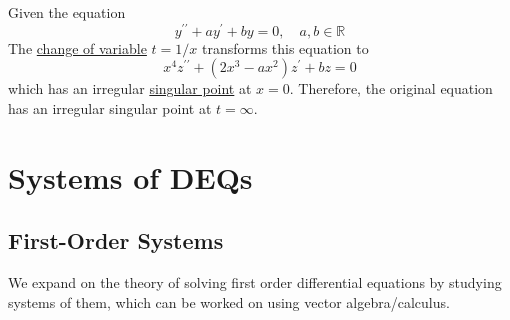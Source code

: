 \documentclass{article}
\newcounter{example}[section]
\begin{document}
      \begin{example}
        \label{ex:removing-the-first-order-term}
      Given the equation
      \begin{equation}
        y^{\prime\prime} + a y^\prime + by = 0, \quad a, b \in \mathbb{R}
      \end{equation}
      The \hyperref[real-thm:change-of-variable]{change of variable} $t = 1/x$ transforms this equation to
      \begin{equation}
        x^4 z^{\prime\prime} + (2x^3 - ax^2) z^\prime + bz = 0
      \end{equation}
      which has an irregular \hyperref[def:singular-point]{singular point} at $x = 0$. Therefore, the original equation has an irregular singular point at $t = \infty$. 
      \end{example}

\section{Systems of DEQs}

  \subsection{First-Order Systems}

    We expand on the theory of solving first order differential equations by studying systems of them, which can be worked on using vector algebra/calculus. 
\end{document}
